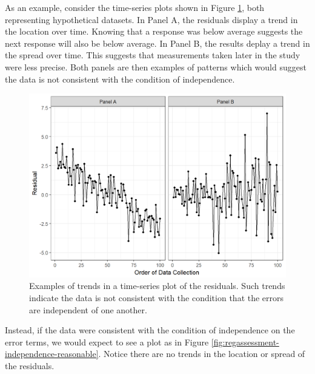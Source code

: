 \documentclass[]{book}
\theoremstyle{plain}
\theoremstyle{mydefn}
\theoremstyle{myexmpl}
\theoremstyle{remark}
\begin{document}
As an example, consider the time-series plots shown in Figure
\ref{fig:regassessment-independence-violations}, both representing
hypothetical datasets. In Panel A, the residuals display a trend in the
location over time. Knowing that a response was below average suggests
the next response will also be below average. In Panel B, the results
deplay a trend in the spread over time. This suggests that measurements
taken later in the study were less precise. Both panels are then
examples of patterns which would suggest the data is not consistent with
the condition of independence.

\begin{figure}

{\centering \includegraphics[width=0.8\linewidth]{./Images/regassessment-independence-violations-1} 

}

\caption{Examples of trends in a time-series plot of the residuals.  Such trends indicate the data is not consistent with the condition that the errors are independent of one another.}\label{fig:regassessment-independence-violations}
\end{figure}

Instead, if the data were consistent with the condition of independence
on the error terms, we would expect to see a plot as in Figure
\ref{fig:regassessment-independence-reasonable}. Notice there are no
trends in the location or spread of the residuals.
\end{document}
